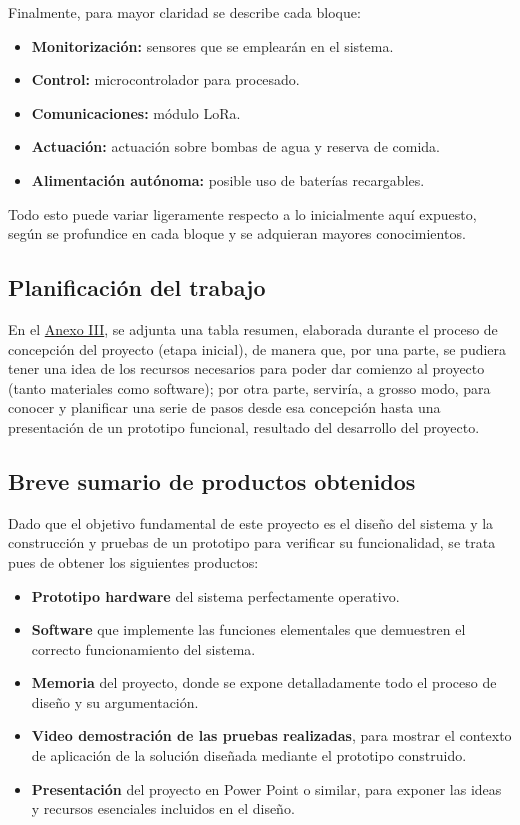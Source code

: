 \documentclass[12pt]{article}
\begin{document}
	\noindent Finalmente, para mayor claridad se describe cada bloque:
	
	\begin{itemize}
		\item \textbf{Monitorización:} sensores que se emplearán en el sistema.
		\item \textbf{Control: }microcontrolador para procesado.
		\item \textbf{Comunicaciones: }módulo LoRa.
		\item \textbf{Actuación: } actuación sobre bombas de agua y reserva de comida.
		\item \textbf{Alimentación autónoma:} posible uso de baterías recargables.
	\end{itemize}
	
	\noindent Todo esto puede variar ligeramente respecto a lo inicialmente aquí expuesto, según se
profundice en cada bloque y se adquieran mayores conocimientos.
	
	\subsection[Planificación del trabajo]{Planificación del trabajo}
	
	\noindent En el \hyperref[anexo III: presupuesto]{Anexo III}, se adjunta una tabla resumen, elaborada durante el proceso de concepción del proyecto (etapa inicial), de manera que, por una parte, se pudiera tener una idea de los recursos necesarios para poder dar comienzo al proyecto (tanto materiales como software); por otra parte, serviría, a grosso modo, para conocer y planificar una serie de pasos desde esa concepción hasta una presentación de un prototipo funcional, resultado del desarrollo del proyecto. 
	
	\subsection[Breve sumario de productos obtenidos]{Breve sumario de productos obtenidos}
	
	\noindent Dado que el objetivo fundamental de este proyecto es el diseño del sistema y la
construcción y pruebas de un prototipo para verificar su funcionalidad, se trata pues
de obtener los siguientes productos:
	
	\begin{itemize}
		\item \textbf{Prototipo hardware} del sistema perfectamente operativo.
		\item \textbf{Software} que implemente las funciones elementales que demuestren el
correcto funcionamiento del sistema.
		\item \textbf{Memoria} del proyecto, donde se expone detalladamente todo el proceso de
diseño y su argumentación.
		\item \textbf{Video demostración de las pruebas realizadas}, para mostrar el
contexto de aplicación de la solución diseñada mediante el prototipo
construido.
		\item \textbf{Presentación} del proyecto en Power Point o similar, para exponer las ideas y
recursos esenciales incluidos en el diseño.
	\end{itemize}
	
\end{document}
